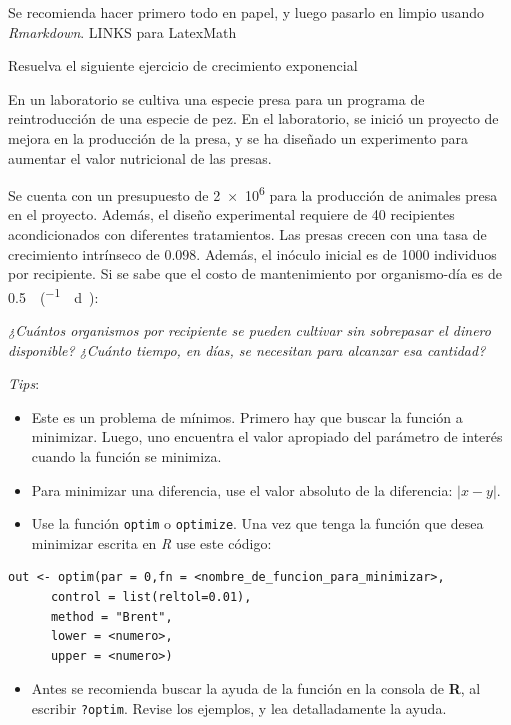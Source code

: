 \documentclass[12pt,letterpaper,]{book}
\providecommand{\tightlist}{%
  \setlength{\itemsep}{0pt}\setlength{\parskip}{0pt}}
\let\BeginKnitrBlock\begin \let\EndKnitrBlock\end
\begin{document}
Se recomienda hacer primero todo en papel, y luego pasarlo en limpio
usando \emph{Rmarkdown}. LINKS para LatexMath

\setcounter{exercise}{0}

\BeginKnitrBlock{exercise}
\protect\hypertarget{exr:T02E01}{}{\label{exr:T02E01} }Resuelva el siguiente
ejercicio de crecimiento exponencial
\EndKnitrBlock{exercise}

En un laboratorio se cultiva una especie presa para un programa de
reintroducción de una especie de pez. En el laboratorio, se inició un
proyecto de mejora en la producción de la presa, y se ha diseñado un
experimento para aumentar el valor nutricional de las presas.

Se cuenta con un presupuesto de \SI{2e6}{} para la producción
de animales presa en el proyecto. Además, el diseño experimental
requiere de 40 recipientes acondicionados con diferentes tratamientos.
Las presas crecen con una tasa de crecimiento intrínseco de \num{0.098}.
Además, el inóculo inicial es de \num{1000} individuos por recipiente.
Si se sabe que el costo de mantenimiento por organismo-día es de
\SI{0.5}{\per(.\day)}:

\emph{¿Cuántos organismos por recipiente se pueden cultivar sin
sobrepasar el dinero disponible? ¿Cuánto tiempo, en días, se necesitan
para alcanzar esa cantidad?}

\emph{Tips}:

\begin{itemize}
\item
  Este es un problema de mínimos. Primero hay que buscar la función a
  minimizar. Luego, uno encuentra el valor apropiado del parámetro de
  interés cuando la función se minimiza.
\item
  Para minimizar una diferencia, use el valor absoluto de la diferencia:
  \(\left| x - y\right|\).
\item
  Use la función \texttt{optim} o \texttt{optimize}. Una vez que tenga
  la función que desea minimizar escrita en \emph{R} use este código:
\end{itemize}

\begin{verbatim}
out <- optim(par = 0,fn = <nombre_de_funcion_para_minimizar>,
      control = list(reltol=0.01),
      method = "Brent", 
      lower = <numero>, 
      upper = <numero>)
\end{verbatim}

\begin{itemize}
\tightlist
\item
  Antes se recomienda buscar la ayuda de la función en la consola de
  \textbf{R}, al escribir \texttt{?optim}. Revise los ejemplos, y lea
  detalladamente la ayuda.
\end{itemize}


\end{document}
